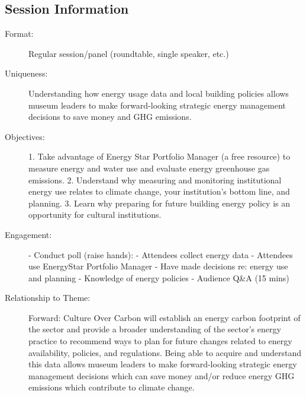 \documentclass{report}
\begin{document}
              \subsection*{Session Information}
                \begin{description}
                  \item [Format:] Regular session/panel (roundtable, single speaker, etc.)
							    
							    \item [Uniqueness:]Understanding how energy usage data and local building policies allows museum leaders to make forward-looking strategic energy management decisions to save money and GHG emissions.
							    \item [Objectives:]1. Take advantage of Energy Star Portfolio Manager (a free resource) to measure energy and water use and evaluate energy greenhouse gas emissions.
2. Understand why measuring and monitoring institutional energy use relates to climate change, your institution’s bottom line, and planning.
3. Learn why preparing for future building energy policy is an opportunity for cultural institutions.
							    \item [Engagement:]- Conduct poll (raise hands):
    - Attendees collect energy data
    - Attendees use EnergyStar Portfolio Manager
    - Have made decisions re: energy use and planning
    - Knowledge of energy policies
- Audience Q\&A (15 mins)
							    \item [Relationship to Theme:]Forward: Culture Over Carbon will establish an energy carbon footprint of the sector and provide a broader understanding of the sector’s energy practice to recommend ways to plan for future changes related to energy availability, policies, and regulations. Being able to acquire and understand this data allows museum leaders to make forward-looking strategic energy management decisions which can save money and/or reduce energy GHG emissions which contribute to climate change.
							    
                \end{description}
\end{document}
